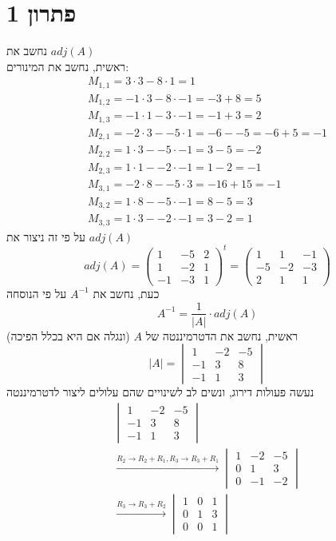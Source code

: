 \documentclass[12pt, titlepage]{article}
\begin{document}
\part*{פתרון 1}
נחשב את $adj\left(A\right)$ \\
ראשית, נחשב את המינורים:
\begin{gather*}
    M_{1,1} = 3\cdot3-8\cdot1=1 \\
    M_{1,2} = -1 \cdot 3 - 8 \cdot -1  = -3 + 8 = 5\\
    M_{1,3} = -1 \cdot 1 - 3 \cdot -1 = -1 + 3 = 2 \\
    M_{2,1} = -2 \cdot 3 - -5 \cdot 1 = -6 - -5 = -6 + 5 = -1 \\
    M_{2,2} = 1 \cdot 3 - -5 \cdot -1 = 3 - 5 = -2 \\
    M_{2,3} = 1 \cdot 1 - -2 \cdot -1 = 1 - 2 = -1 \\
    M_{3,1} = -2 \cdot 8 - -5 \cdot 3 = -16 + 15 = -1 \\
    M_{3,2} = 1 \cdot 8 - -5\cdot -1 = 8-5 = 3 \\
    M_{3,3} = 1 \cdot 3 - -2 \cdot -1 = 3 -2 = 1
\end{gather*}
על פי זה ניצור את $adj\left(A\right)$
\[
    adj\left(A\right) = \begin{pmatrix}
        1 & -5 & 2 \\
        1 & -2 & 1 \\
        -1 & -3 & 1
    \end{pmatrix}^{t} = \begin{pmatrix}
        1 & 1 & -1 \\
        -5 & -2 & -3 \\
        2 & 1 & 1
    \end{pmatrix}
\]
כעת, נחשב את $A^{-1}$ על פי הנוסחה
\[
    A^{-1} = \frac{1}{\left|A\right|} \cdot adj\left(A\right)
\]
ראשית, נחשב את הדטרמיננטה של $A$ (ונגלה אם היא בכלל הפיכה)
\[
    \left|A\right| = \begin{vmatrix}
         1 & -2 & -5 \\
        -1 & 3 & 8 \\
        -1 & 1 & 3
    \end{vmatrix}
\]
נעשה פעולות דירוג, ונשים לב לשינויים שהם עלולים ליצור לדטרמיננטה
\begin{gather*}
     \begin{vmatrix}
         1 & -2 & -5 \\
        -1 & 3 & 8 \\
        -1 & 1 & 3
    \end{vmatrix} \\
    \xrightarrow{R_2 \to R_2 + R_1, R_3 \to R_3 + R_1} \begin{vmatrix}
        1 & -2 & -5 \\
        0 & 1 & 3 \\
        0 & -1 & -2
    \end{vmatrix}\\
    \xrightarrow{R_3 \to R_3 + R_2 } \begin{vmatrix}
        1 & 0 & 1 \\
        0 & 1 & 3 \\
        0 & 0 & 1
    \end{vmatrix}
\end{gather*}
\end{document}
